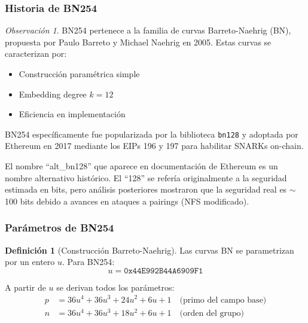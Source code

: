 \documentclass[11pt,a4paper,twoside,openright]{book}
\theoremstyle{definition}
\newtheorem{definition}{Definición}[chapter]
\theoremstyle{plain}
\theoremstyle{remark}
\newtheorem{remark}{Observación}[chapter]
\begin{document}
\subsubsection{Historia de BN254}

\begin{remark}
BN254 pertenece a la familia de curvas Barreto-Naehrig (BN), propuesta por Paulo Barreto y Michael Naehrig en 2005. Estas curvas se caracterizan por:
\begin{itemize}
    \item Construcción paramétrica simple
    \item Embedding degree $k = 12$
    \item Eficiencia en implementación
\end{itemize}

BN254 específicamente fue popularizada por la biblioteca \texttt{bn128} y adoptada por Ethereum en 2017 mediante los EIPs 196 y 197 para habilitar SNARKs on-chain.
\end{remark}

\begin{intuicion}
El nombre ``alt\_bn128'' que aparece en documentación de Ethereum es un nombre alternativo histórico. El ``128'' se refería originalmente a la seguridad estimada en bits, pero análisis posteriores mostraron que la seguridad real es $\sim$100 bits debido a avances en ataques a pairings (NFS modificado).
\end{intuicion}

\subsubsection{Parámetros de BN254}

\begin{definition}[Construcción Barreto-Naehrig]
Las curvas BN se parametrizan por un entero $u$. Para BN254:
\[ u = \texttt{0x44E992B44A6909F1} \]

A partir de $u$ se derivan todos los parámetros:
\begin{align}
p &= 36u^4 + 36u^3 + 24u^2 + 6u + 1 \quad \text{(primo del campo base)} \\
n &= 36u^4 + 36u^3 + 18u^2 + 6u + 1 \quad \text{(orden del grupo)}
\end{align}
\end{definition}
\end{document}
